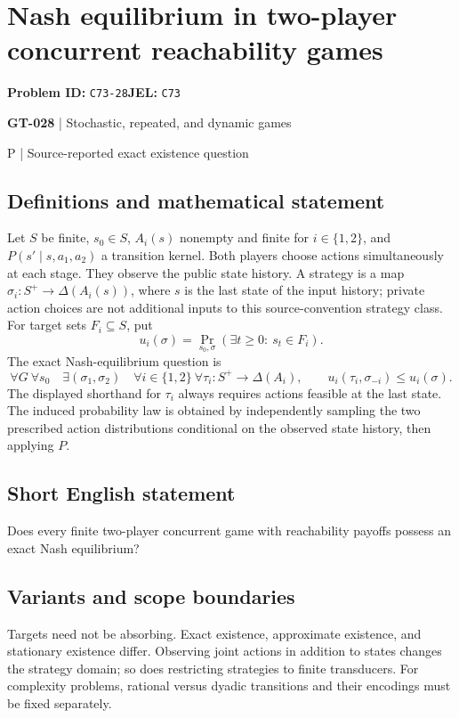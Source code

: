 \documentclass[11pt,a4paper]{article}
\begin{document}
\section*{Nash equilibrium in two-player concurrent reachability games}
\textbf{Problem ID:} \texttt{C73-28}\quad \textbf{JEL:} \texttt{C73}\par
\label{problem:OP-0158}
\label{game:GT-028}
{\sffamily\small\color{muted}
{\sffamily\small\color{muted}\textbf{GT-028} | Stochastic, repeated, and dynamic games\par P | Source-reported exact existence question\par}
\par}
\subsection*{Definitions and mathematical statement}
Let $S$ be finite, $s_0\in S$, $A_i(s)$ nonempty and finite for $i\in\{1,2\}$, and $P(s'\mid s,a_1,a_2)$ a transition kernel. Both players choose actions simultaneously at each stage. They observe the public state history. A strategy is a map $\sigma_i:S^+\to\Delta(A_i(s))$, where $s$ is the last state of the input history; private action choices are not additional inputs to this source-convention strategy class. For target sets $F_i\subseteq S$, put
\[
 u_i(\sigma)=\Pr_{s_0,\sigma}(\exists t\geq0:\ s_t\in F_i).
\]
The exact Nash-equilibrium question is
\[
 \forall G\ \forall s_0\quad\exists(\sigma_1,\sigma_2)\quad
 \forall i\in\{1,2\}\ \forall\tau_i:S^+\to\Delta(A_i),
 \qquad u_i(\tau_i,\sigma_{-i})\leq u_i(\sigma).
\]
The displayed shorthand for $\tau_i$ always requires actions feasible at the last state. The induced probability law is obtained by independently sampling the two prescribed action distributions conditional on the observed state history, then applying $P$.
\subsection*{Short English statement}
Does every finite two-player concurrent game with reachability payoffs possess an exact Nash equilibrium?
\subsection*{Variants and scope boundaries}
Targets need not be absorbing. Exact existence, approximate existence, and stationary existence differ. Observing joint actions in addition to states changes the strategy domain; so does restricting strategies to finite transducers. For complexity problems, rational versus dyadic transitions and their encodings must be fixed separately.
\end{document}
